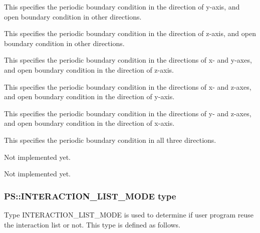This specifies the periodic boundary condition in the direction of y-axis,
and open boundary condition in other directions.


This specifies the periodic boundary condition in the direction of z-axis,
and open boundary condition in other directions.


This specifies the periodic boundary condition in the directions of x- and
y-axes, and open boundary condition in the direction of z-axis.


This specifies the periodic boundary condition in the directions of x- and
z-axes, and open boundary condition in the direction of y-axis.


This specifies the periodic boundary condition in the directions of y-
and z-axes, and open boundary condition in the direction of x-axis.


This specifies the periodic boundary condition in all three directions.


Not implemented yet.


Not implemented yet.

\subsubsection{PS::INTERACTION\_LIST\_MODE type}
\label{sec:datatype_enum_interaction_list_mode}



Type INTERACTION\_LIST\_MODE is used to determine if user program
reuse the interaction list or not. This type is defined as follows.


